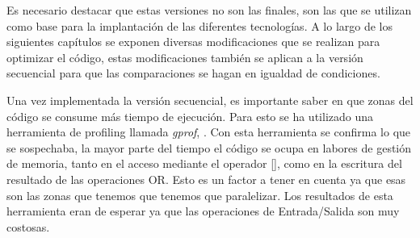 Es necesario destacar que estas versiones no son las finales, son las que se utilizan como base para la implantación de las diferentes tecnologías. A lo largo de los siguientes capítulos se exponen diversas modificaciones que se realizan para optimizar el código, estas modificaciones también se aplican a la versión secuencial para que las comparaciones se hagan en igualdad de condiciones.

Una vez implementada la versión secuencial, es importante saber en que zonas del código se consume más tiempo de ejecución. Para esto se ha utilizado una herramienta de profiling llamada \textit{gprof}, \cite{unknown-author-no-dateI}. Con esta herramienta se confirma lo que se sospechaba, la mayor parte del tiempo el código se ocupa en labores de gestión de memoria, tanto en el acceso mediante el operador [], como en la escritura del resultado de las operaciones OR. Esto es un factor a tener en cuenta ya que esas son las zonas que tenemos que tenemos que paralelizar. Los resultados de esta herramienta eran de esperar ya que las operaciones de Entrada/Salida son muy costosas.